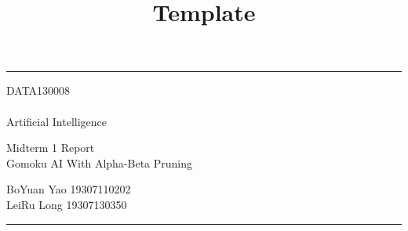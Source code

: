 \documentclass[a4paper, 12pt]{article} %
\begin{document}

\title{Template} %
\fancyhead[C]{}
\hrule \medskip %
\begin{minipage}{0.295\textwidth} %
    \raggedright
    DATA130008\\ %
    \footnotesize %
    \hfill\\
    Artificial Intelligence\\ %
\end{minipage}
\begin{minipage}{0.4\textwidth} %
    \centering
    \large %
    Midterm 1 Report\\ %
    \normalsize %
    Gomoku AI With Alpha-Beta Pruning\\ %
\end{minipage}
\begin{minipage}{0.295\textwidth} %
    \raggedleft
    BoYuan Yao 19307110202\\ %
    LeiRu Long 19307130350
    \footnotesize %
\end{minipage}
\medskip\hrule %
\bigskip

\end{document}
